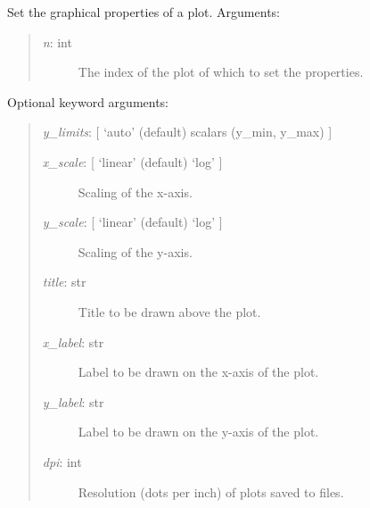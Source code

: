 \documentclass[letterpaper,10pt,english]{sphinxmanual}
\begin{document}
\begin{fulllineitems}
\begin{fulllineitems}
\begin{quote}
\begin{description}
\end{description}
\end{quote}

\end{fulllineitems}


\begin{fulllineitems}
\label{api:mpl.Chart2D.set_plot_properties}
Set the graphical properties of a plot.
Arguments:
\begin{quote}
\begin{description}
\item[{\emph{n}: int}] \leavevmode
The index of the plot of which to set the properties.

\end{description}
\end{quote}

Optional keyword arguments:
\begin{quote}

\emph{y\_limits}: {[} `auto' (default) \textbar{} scalars (y\_min, y\_max) {]}
\begin{description}
\item[{\emph{x\_scale}: {[} `linear' (default) \textbar{} `log' {]}}] \leavevmode
Scaling of the x-axis.

\item[{\emph{y\_scale}: {[} `linear' (default) \textbar{} `log' {]}}] \leavevmode
Scaling of the y-axis.

\item[{\emph{title}: str}] \leavevmode
Title to be drawn above the plot.

\item[{\emph{x\_label}: str}] \leavevmode
Label to be drawn on the x-axis of the plot.

\item[{\emph{y\_label}: str}] \leavevmode
Label to be drawn on the y-axis of the plot.

\item[{\emph{dpi}: int}] \leavevmode
Resolution (dots per inch) of plots saved to files.

\end{description}
\end{quote}

\end{fulllineitems}



\end{fulllineitems}
\end{document}
